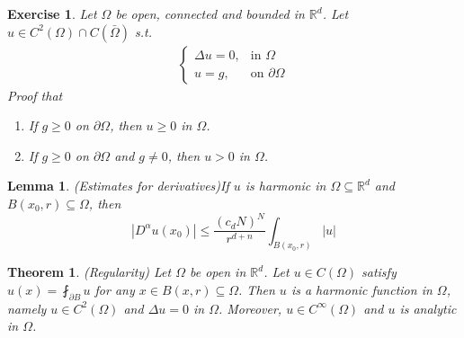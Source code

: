 \documentclass{report}
\theoremstyle{tommy}
\newtheorem{thm}[defn]{Theorem}
\newtheorem{lem}[defn]{Lemma}
\newtheorem{ex}[defn]{Exercise}
\begin{document}
\begin{ex}
  Let \(\Omega\) be open, connected and bounded in \(\mathbb{R}^d\). Let \(u \in C^2(\Omega) \cap C(\bar \Omega)\) s.t. 
  \begin{align*}
    \begin{cases}
      \Delta u = 0, &\text{in } \Omega \\
      u = g, &\text{on } \partial \Omega
    \end{cases}
  \end{align*}
  Proof that \begin{enumerate}
    \item If \(g \ge 0\) on \(\partial \Omega\), then \(u \ge 0\) in \(\Omega\). 
    \item If \(g \ge 0\) on \(\partial \Omega\) and \(g \ne 0\), then \(u > 0\) in \(\Omega\).
  \end{enumerate}
\end{ex}

\begin{lem} (Estimates for derivatives)\label{estimates-of-derivatives} If \(u\) is harmonic in \(\Omega \subseteq \mathbb{R}^d\) and \(B(x_0, r) \subseteq \Omega\), then 
  \[|D^\alpha u(x_0)| \le \frac{(c_d N)^N}{r^{d+n}} \int_{B(x_0, r)} |u|\]
\end{lem}

\begin{thm} (Regularity)
  Let \(\Omega\) be open in \(\mathbb{R}^d\). Let \(u \in C(\Omega)\) satisfy \(u(x) = \fint_{\partial B} u\) for any \(x \in B(x, r) \subseteq \Omega\). Then \(u\) is a harmonic function in \(\Omega\), namely \(u \in C^2(\Omega)\) and \(\Delta u = 0\) in \(\Omega\). Moreover, \(u \in C^\infty(\Omega)\) and \(u\) is analytic in \(\Omega\).
\end{thm}
\end{document}
